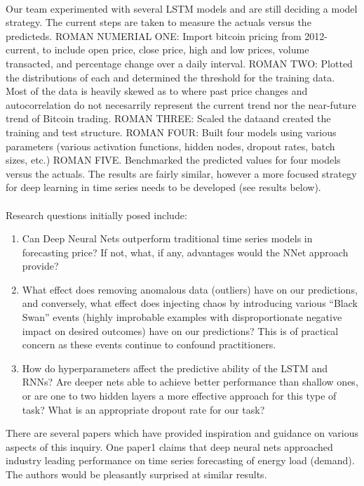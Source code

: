 \documentclass{article}
\begin{document}
\paragraph{}
Our team experimented with several LSTM models and are still deciding a model strategy. The current steps are taken to measure the actuals versus the predicteds. ROMAN NUMERIAL ONE: Import bitcoin pricing from 2012-current, to include open price, close price, high and low prices, volume transacted, and percentage change over a daily interval. ROMAN TWO: Plotted the distributions of each and determined the threshold for the training data. Most of the data is heavily skewed as to where past price changes and autocorrelation do not necesarrily represent the current trend nor the near-future trend of Bitcoin trading. ROMAN THREE: Scaled the dataand created the training and test structure. ROMAN FOUR: Built four models using various parameters (various activation functions, hidden nodes, dropout rates, batch sizes, etc.) ROMAN FIVE. Benchmarked the predicted values for four models versus the actuals. The results are fairly similar, however a more focused strategy for deep learning in time series needs to be developed (see results below).
\paragraph{}
Research questions initially posed include:
\begin{enumerate}
    \item Can Deep Neural Nets outperform traditional time series models in forecasting price? If not, what, if any, advantages would the NNet approach provide?
    \item What effect does removing anomalous data (outliers) have on our predictions, and conversely, what effect does injecting chaos by introducing various “Black Swan” events (highly improbable examples with disproportionate negative impact on desired outcomes) have on our predictions? This is of practical concern as these events continue to confound practitioners.
    \item How do hyperparameters affect the predictive ability of the LSTM and RNNs? Are deeper nets able to achieve better performance than shallow ones, or are one to two hidden layers a more effective approach for this type of task? What is an appropriate dropout rate for our task?
\end{enumerate}

There are several papers which have provided inspiration and guidance on various aspects of this inquiry. One paper1 claims that deep neural nets approached industry leading performance on time series forecasting of energy load (demand). The authors would be pleasantly surprised at similar results.
\end{document}
